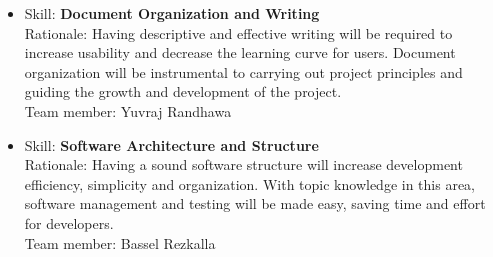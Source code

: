 \documentclass[12pt]{article}
\begin{document}
\begin{itemize}
		\item Skill: \textbf{Document Organization and Writing}
		\\ Rationale: Having descriptive and effective writing will be required to increase usability and decrease the learning curve for users. Document organization will be instrumental to carrying out project principles and guiding the growth and development of the project.
		\\ Team member: Yuvraj Randhawa
		
		\item Skill: \textbf{Software Architecture and Structure}
		\\ Rationale: Having a sound software structure will increase development efficiency, simplicity and organization. With topic knowledge in this area, software management and testing will be made easy, saving time and effort for developers.
		\\ Team member: Bassel Rezkalla
		
		
	\end{itemize}
\end{document}
